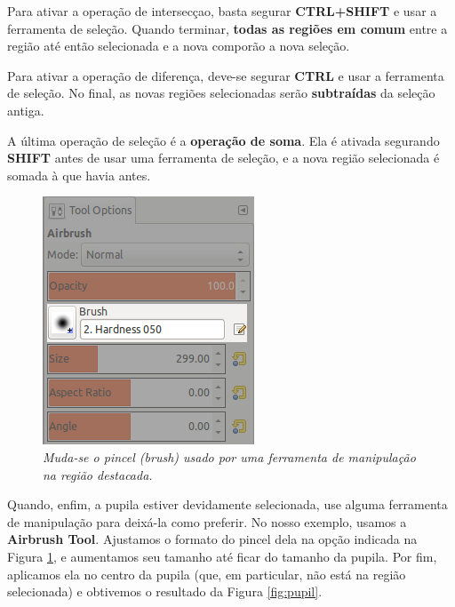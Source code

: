 \documentclass[12pt,onecolumn]{article}
\begin{document}
    Para ativar a operação de intersecçao, basta segurar {\bf CTRL+SHIFT} e usar
    a ferramenta de seleção. Quando terminar, {\bf todas as regiões em comum}
    entre a região até então selecionada e a nova comporão a nova seleção.
    
    Para ativar a operação de diferença, deve-se segurar {\bf CTRL} e usar a
    ferramenta de seleção. No final, as novas regiões selecionadas serão {\bf
    subtraídas} da seleção antiga.
    
    \begin{framed}
      A última operação de seleção é a {\bf operação de soma}. Ela é ativada
      segurando {\bf SHIFT} antes de usar uma ferramenta de seleção, e a nova
      região selecionada é somada à que havia antes.
    \end{framed}
    
    \begin{figure}[ht]
      \centering
      \includegraphics[width=.5\textwidth]{screenshots/04-setting_brush.png}
      \caption{
        \footnotesize
        \it
        Muda-se o pincel ({\it brush}) usado por uma ferramenta de manipulação
        na região destacada.
      }
      \label{fig:setting_brush}
    \end{figure}
    
    Quando, enfim, a pupila estiver devidamente selecionada, use alguma
    ferramenta de manipulação para deixá-la como preferir. No nosso exemplo,
    usamos a {\bf Airbrush Tool}. Ajustamos o formato do pincel dela na opção
    indicada na Figura \ref{fig:setting_brush}, e aumentamos seu tamanho até
    ficar do tamanho da pupila. Por fim, aplicamos ela no centro da pupila (que,
    em particular, não está na região selecionada) e obtivemos o resultado da
    Figura \ref{fig:pupil}.
    
\end{document}
